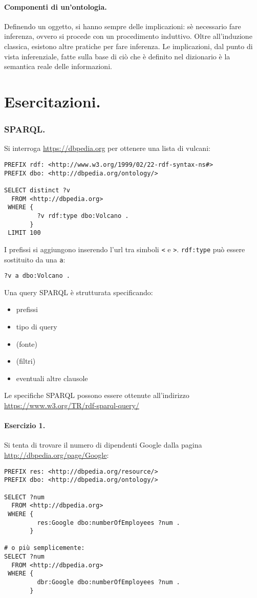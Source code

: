 \documentclass[11pt]{article}
\begin{document}
\begin{multicols}{2}
\subsection{Componenti di un'ontologia.}
Definendo un oggetto, si hanno sempre delle implicazioni: sè necessario fare inferenza, ovvero si procede con un procedimento induttivo.
Oltre all'induzione classica, esistono altre pratiche per fare inferenza.
Le implicazioni, dal punto di vista inferenziale, fatte sulla base di ciò che è definito nel dizionario è la semantica reale delle informazioni.


\newpage
\end{multicols}
\part{Esercitazioni.}

\section{SPARQL.}
Si interroga \url{https://dbpedia.org} per ottenere una lista di vulcani:
\begin{verbatim}
PREFIX rdf: <http://www.w3.org/1999/02/22-rdf-syntax-ns#>
PREFIX dbo: <http://dbpedia.org/ontology/>

SELECT distinct ?v
  FROM <http://dbpedia.org>
 WHERE {
         ?v rdf:type dbo:Volcano .
       }
 LIMIT 100
\end{verbatim}
I prefissi si aggiungono inserendo l'url tra simboli \verb|<| e \verb|>|.
\verb|rdf:type| può essere sostituito da una \verb|a|:
\begin{verbatim}
?v a dbo:Volcano .
\end{verbatim}

Una query SPARQL è strutturata specificando:
\begin{itemize}
  \item prefissi
  \item tipo di query
  \item (fonte)
  \item (filtri)
  \item eventuali altre clausole
\end{itemize}
Le specifiche SPARQL possono essere ottenute all'indirizzo \url{https://www.w3.org/TR/rdf-sparql-query/}

\subsection*{Esercizio 1.}
Si tenta di trovare il numero di dipendenti Google dalla pagina \url{http://dbpedia.org/page/Google}:
\begin{verbatim}
PREFIX res: <http://dbpedia.org/resource/>
PREFIX dbo: <http://dbpedia.org/ontology/>

SELECT ?num
  FROM <http://dbpedia.org>
 WHERE {
         res:Google dbo:numberOfEmployees ?num .
       }

# o più semplicemente:
SELECT ?num
  FROM <http://dbpedia.org>
 WHERE {
         dbr:Google dbo:numberOfEmployees ?num .
       }
\end{verbatim}
\end{document}
